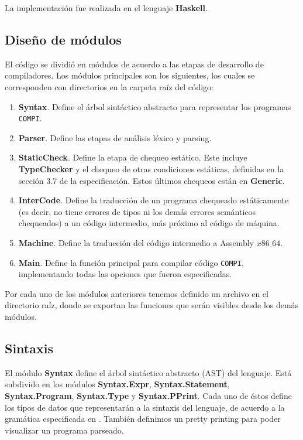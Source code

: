 \documentclass[a4paper,10pt]{article}
\begin{document}
\noindent La implementación fue realizada en el lenguaje \textbf{Haskell}.


\subsection{Diseño de módulos}

El código se dividió en módulos de acuerdo a las etapas de desarrollo de compiladores. Los módulos principales son los siguientes,
los cuales se corresponden con directorios en la carpeta raíz del código:

\begin{enumerate}
 \item \textbf{Syntax}. Define el árbol sintáctico abstracto para representar los programas \verb|COMPI|.
 \item \textbf{Parser}. Define las etapas de análisis léxico y parsing. 
 \item \textbf{StaticCheck}. Define la etapa de chequeo estático. Este incluye \textbf{TypeChecker} y el chequeo
			de otras condiciones estáticas, definidas en la sección 3.7 de la especificación. Estos últimos
			chequeos están en \textbf{Generic}.
  \item \textbf{InterCode}. Define la traducción de un programa chequeado estáticamente (es decir, no tiene errores de tipos ni
			los demás errores semánticos chequeados) a un código intermedio, más próximo al código de máquina.
  \item \textbf{Machine}. Define la traducción del código intermedio a Assembly $x86\_64$.
  \item \textbf{Main}. Define la función principal para compilar código \verb|COMPI|, implementando todas las opciones que fueron
		      especificadas.
\end{enumerate}

Por cada uno de los módulos anteriores tenemos definido un archivo en el directorio raíz, donde se exportan las funciones que serán visibles desde
los demás módulos.

\subsection{Sintaxis}

El módulo \textbf{Syntax} define el árbol sintáctico abstracto (AST) del lenguaje. Está subdivido en los módulos \textbf{Syntax.Expr}, 
\textbf{Syntax.Statement}, \textbf{Syntax.Program}, \textbf{Syntax.Type} y \textbf{Syntax.PPrint}. Cada uno de éstos define los tipos de datos
que representarán a la sintaxis del lenguaje, de acuerdo a la gramática especificada en \cite{COMPISpec}. También definimos un pretty printing para
poder visualizar un programa parseado.
\end{document}
